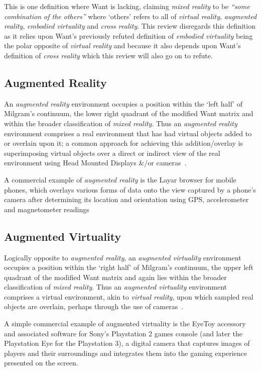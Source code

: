 This is one definition where Want is lacking, claiming \textit{mixed reality} to be \textit{``some combination of the others''} where `others' refers to all of \textit{virtual reality}, \textit{augmented reality}, \textit{embodied virtuality} and \textit{cross reality}. This review disregards this definition as it relies upon Want's previously refuted definition of \textit{embodied virtuality} being the polar opposite of \textit{virtual reality} and because it also depends upon Want's definition of \textit{cross reality} which this review will also go on to refute.

\subsection{Augmented Reality}
An \textit{augmented reality} environment occupies a position within the `left half' of Milgram's continuum, the lower right quadrant of the modified Want matrix and within the broader classification of \textit{mixed reality}. Thus an \textit{augmented reality} environment comprises a real environment that has had virtual objects added to or overlain upon it; a common approach for achieving this addition/overlay is superimposing virtual objects over a direct or indirect view of the real environment using Head Mounted Displays \&/or cameras~\cite{Krevelen2010}.

A commercial example of \textit{augmented reality} is the Layar browser for mobile phones, which overlays various forms of data onto the view captured by a phone's camera after determining its location and orientation using GPS, accelerometer and magnetometer readings~\cite{eishita:layar}


\subsection{Augmented Virtuality}
Logically opposite to \textit{augmented reality}, an \textit{augmented virtuality} environment occupies a position within the `right half' of Milgram's continuum, the upper left quadrant of the modified Want matrix and again lies within the broader classification of \textit{mixed reality}. Thus an \textit{augmented virtuality} environment comprises a virtual environment, akin to \textit{virtual reality}, upon which sampled real objects are overlain, perhaps through the use of cameras~\cite{caballero:behand}.

A simple commercial example of augmented virtuality is the EyeToy accessory and associated software for Sony's Playstation 2 games console (and later the Playstation Eye for the Playstation 3), a digital camera that captures images of players and their surroundings and integrates them into the gaming experience presented on the screen.

